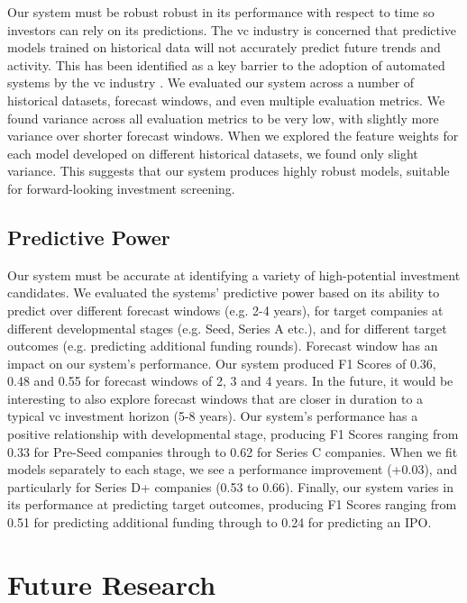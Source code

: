 \documentclass[../thesis/thesis.tex]{subfiles}
\begin{document}
Our system must be robust robust in its performance with respect to time so investors can rely on its predictions. The \gls{vc} industry is concerned that predictive models trained on historical data will not accurately predict future trends and activity. This has been identified as a key barrier to the adoption of automated systems by the \gls{vc} industry \cite{stone2014}. We evaluated our system across a number of historical datasets, forecast windows, and even multiple evaluation metrics. We found variance across all evaluation metrics to be very low, with slightly more variance over shorter forecast windows. When we explored the feature weights for each model developed on different historical datasets, we found only slight variance. This suggests that our system produces highly robust models, suitable for forward-looking investment screening.

\subsection{Predictive Power}

Our system must be accurate at identifying a variety of high-potential investment candidates. We evaluated the systems' predictive power based on its ability to predict over different forecast windows (e.g. 2-4 years), for target companies at different developmental stages (e.g. Seed, Series A etc.), and for different target outcomes (e.g. predicting additional funding rounds). Forecast window has an impact on our system's performance. Our system produced F1 Scores of 0.36, 0.48 and 0.55 for forecast windows of 2, 3 and 4 years. In the future, it would be interesting to also explore forecast windows that are closer in duration to a typical \gls{vc} investment horizon (5-8 years). Our system's performance has a positive relationship with developmental stage, producing F1 Scores ranging from 0.33 for Pre-Seed companies through to 0.62 for Series C companies. When we fit models separately to each stage, we see a performance improvement (+0.03), and particularly for Series D+ companies (0.53 to 0.66). Finally, our system varies in its performance at predicting target outcomes, producing F1 Scores ranging from 0.51 for predicting additional funding through to 0.24 for predicting an IPO.

\section{Future Research}
\end{document}
